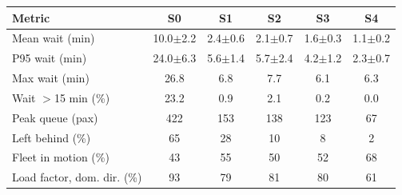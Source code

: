 \begin{tabular}{@{}lccccc@{}}\toprule
Metric & S0 & S1 & S2 & S3 & S4 \\ \midrule
Mean wait (min) & 10.0$\pm$2.2 & 2.4$\pm$0.6 & 2.1$\pm$0.7 & 1.6$\pm$0.3 & 1.1$\pm$0.2 \\
P95 wait (min) & 24.0$\pm$6.3 & 5.6$\pm$1.4 & 5.7$\pm$2.4 & 4.2$\pm$1.2 & 2.3$\pm$0.7 \\
Max wait (min) & 26.8 & 6.8 & 7.7 & 6.1 & 6.3 \\
Wait $>$15 min (\%) & 23.2 & 0.9 & 2.1 & 0.2 & 0.0 \\
Peak queue (pax) & 422 & 153 & 138 & 123 & 67 \\
Left behind (\%) & 65 & 28 & 10 & 8 & 2 \\
Fleet in motion (\%) & 43 & 55 & 50 & 52 & 68 \\
Load factor, dom. dir. (\%) & 93 & 79 & 81 & 80 & 61 \\
\bottomrule\end{tabular}

